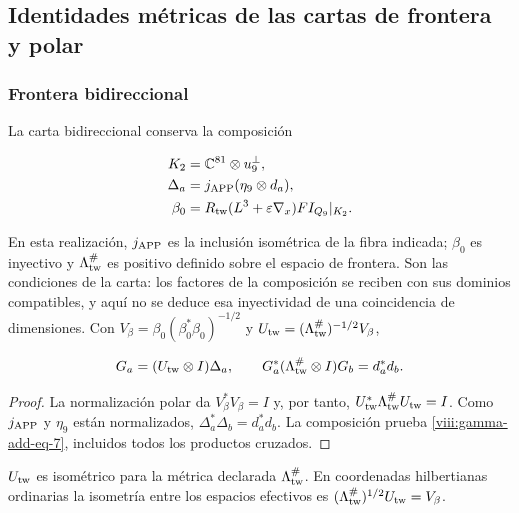 \subsection{Identidades métricas de las cartas de frontera y polar}
\label{viii:gamma-add-sub-195}

\subsubsection{Frontera bidireccional}
\label{viii:gamma-add-sub-197}

La carta bidireccional conserva la composición

\begin{equation}
\begin{aligned}
K_2&=\mathbb C^{81}\otimes u_9^\perp,\\
\Delta_a&=j_{\rm APP}(\eta_9\otimes d_a),\\
\beta_0&=R_{\rm tw}(L^3+\varepsilon\nabla_x)FI_{Q_9}|_{K_2}.
\end{aligned}
\label{viii:gamma-add-display-16}
\end{equation}

En esta realización, \(j_{\rm APP}\) es la inclusión isométrica
de la fibra indicada; \(\beta_0\) es inyectivo y
\(\Lambda_{\rm tw}^{\#}\) es positivo definido sobre el espacio
de frontera. Son las condiciones de la carta: los factores de la
composición se reciben con sus dominios compatibles, y aquí no se
deduce esa inyectividad de una coincidencia de dimensiones.
Con \(V_\beta=\beta_0(\beta_0^*\beta_0)^{-1/2}\) y
\(U_{\rm tw}=(\Lambda_{\rm tw}^{\#})^{-1/2}V_\beta\),

\begin{equation}
G_a=(U_{\rm tw}\otimes I)\Delta_a,\qquad
G_a^*(\Lambda_{\rm tw}^{\#}\otimes I)G_b=d_a^*d_b.
\label{viii:gamma-add-eq-7}
\end{equation}

\begin{proof}
La normalización polar da \(V_\beta^*V_\beta=I\) y, por tanto,
\(U_{\rm tw}^*\Lambda_{\rm tw}^{\#}U_{\rm tw}=I\).
Como \(j_{\rm APP}\) y \(\eta_9\) están normalizados,
\(\Delta_a^*\Delta_b=d_a^*d_b\). La composición prueba
\eqref{viii:gamma-add-eq-7}, incluidos todos los productos cruzados.
\end{proof}
\(U_{\rm tw}\) es isométrico para la métrica declarada
\(\Lambda_{\rm tw}^{\#}\). En coordenadas hilbertianas ordinarias
la isometría entre los espacios efectivos es
\((\Lambda_{\rm tw}^{\#})^{1/2}U_{\rm tw}=V_\beta\).

